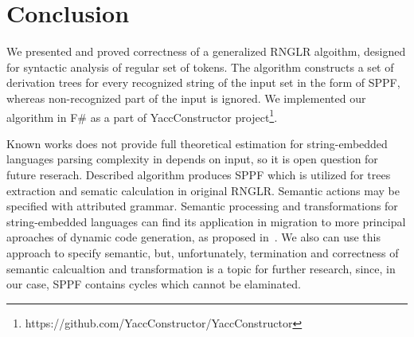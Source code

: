 \section{Conclusion}
%

We presented and proved correctness of a generalized RNGLR algoithm, designed for syntactic analysis of regular set of
tokens. The algorithm constructs a set of derivation trees for every recognized string of the input set in the form of SPPF, 
whereas non-recognized part of the input is ignored. We implemented our algorithm in F\# as a part of YaccConstructor 
project\footnote{https://github.com/YaccConstructor/YaccConstructor}.

Known works does not provide full theoretical estimation for string-embedded languages parsing complexity in depends on input, so it is open question for future reserach.
Described algorithm produces SPPF which is utilized for trees extraction and sematic calculation in original RNGLR. Semantic actions may be specified with attributed grammar.
Semantic processing and transformations for string-embedded languages can find its application in migration to more principal aproaches of dynamic code generation, as proposed in~\cite{EvalToStaged}.
We also can use this approach to specify semantic, but, unfortunately, termination and correctness of semantic calcualtion and transformation is a topic for further research, 
since, in our case, SPPF contains cycles which cannot be elaminated. 

